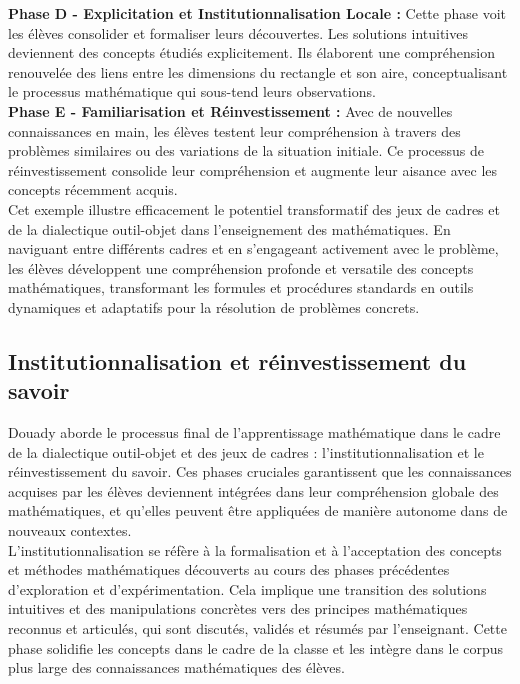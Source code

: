 \textbf{Phase D - Explicitation et Institutionnalisation Locale :}
Cette phase voit les élèves consolider et formaliser leurs découvertes.
Les solutions intuitives deviennent des concepts étudiés explicitement.
Ils élaborent une compréhension renouvelée des liens entre les dimensions du rectangle et son aire,
conceptualisant le processus mathématique qui sous-tend leurs observations.\\

\textbf{Phase E - Familiarisation et Réinvestissement :}
Avec de nouvelles connaissances en main,
les élèves testent leur compréhension à travers des problèmes similaires ou des variations de la situation initiale.
Ce processus de réinvestissement consolide leur compréhension et augmente leur aisance avec les concepts récemment acquis.\\

Cet exemple illustre efficacement le potentiel transformatif des jeux de cadres et de la dialectique outil-objet dans l'enseignement des mathématiques.
En naviguant entre différents cadres et en s'engageant activement avec le problème,
les élèves développent une compréhension profonde et versatile des concepts mathématiques,
transformant les formules et procédures standards en outils dynamiques et adaptatifs pour la résolution de problèmes concrets.

\subsection{Institutionnalisation et réinvestissement du savoir}

Douady aborde le processus final de l'apprentissage mathématique dans le cadre de la dialectique outil-objet et des jeux de cadres :
l'institutionnalisation et le réinvestissement du savoir.
Ces phases cruciales garantissent que les connaissances acquises par les élèves deviennent intégrées dans leur compréhension globale des mathématiques,
et qu'elles peuvent être appliquées de manière autonome dans de nouveaux contextes.\\

L'institutionnalisation se réfère à la formalisation et à l'acceptation des concepts et méthodes mathématiques découverts au cours des phases précédentes d'exploration et d'expérimentation.
Cela implique une transition des solutions intuitives et des manipulations concrètes vers des principes mathématiques reconnus et articulés,
qui sont discutés,
validés et résumés par l'enseignant.
Cette phase solidifie les concepts dans le cadre de la classe et les intègre dans le corpus plus large des connaissances mathématiques des élèves.\\

